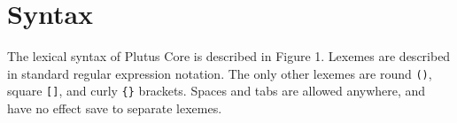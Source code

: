 \documentclass[conference]{IEEEtran}
\begin{document}


\section{Syntax}

The lexical syntax of Plutus Core is described in Figure 1.  Lexemes
are described in standard regular expression notation.  The only other
lexemes are round \texttt{()}, square \texttt{[]}, and curly \texttt{\{\}}
brackets.  Spaces and tabs are allowed anywhere, and have no effect
save to separate lexemes.
\end{document}
